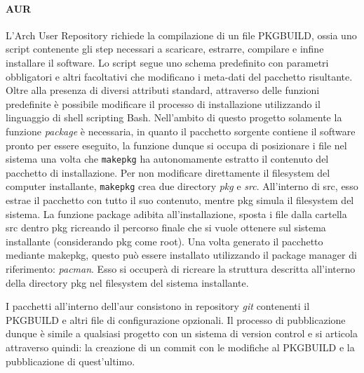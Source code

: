 \paragraph{AUR} L'Arch User Repository richiede la compilazione di un file PKGBUILD, ossia uno script contenente gli step necessari a scaricare, estrarre, compilare e infine installare il software. Lo script segue uno schema predefinito con parametri obbligatori e altri facoltativi che modificano i meta-dati del pacchetto risultante. Oltre alla presenza di diversi attributi standard, attraverso delle funzioni predefinite è possibile modificare il processo di installazione utilizzando il linguaggio di shell scripting Bash.
Nell'ambito di questo progetto solamente la funzione \textit{package} è necessaria, in quanto il pacchetto sorgente contiene il software pronto per essere eseguito, la funzione dunque si occupa di posizionare i file nel sistema una volta che \texttt{makepkg} ha autonomamente estratto il contenuto del pacchetto di installazione. Per non modificare direttamente il filesystem del computer installante, \texttt{makepkg} crea due directory \textit{pkg} e \textit{src}. All'interno di src, esso estrae il pacchetto con tutto il suo contenuto, mentre pkg simula il filesystem del sistema. La funzione package adibita all'installazione, sposta i file dalla cartella src dentro pkg ricreando il percorso finale che si vuole ottenere sul sistema installante (considerando pkg come root). Una volta generato il pacchetto mediante makepkg, questo può essere installato utilizzando il package manager di riferimento: \textit{pacman}. Esso si occuperà di ricreare la struttura descritta all'interno della directory pkg nel filesystem del sistema installante.

I pacchetti all'interno dell'\ac{aur} consistono in repository \textit{git} contenenti il PKGBUILD e altri file di configurazione opzionali. Il processo di pubblicazione dunque è simile a qualsiasi progetto con un sistema di version control e si articola attraverso quindi: la creazione di un commit con le modifiche al PKGBUILD e la pubblicazione di quest'ultimo.

